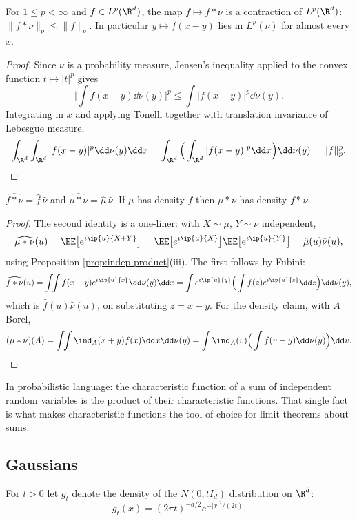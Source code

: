 \begin{proposition}\label{prop:conv-contraction}
	For $1\leq p<\infty$ and $f \in L^p(\R^d)$, the map $f \mapsto f*\nu$ is a contraction of $L^p(\R^d)$: $\|f*\nu\|_p \leq \|f\|_p$. In particular $y \mapsto f(x-y)$ lies in $L^p(\nu)$ for almost every $x$.
\end{proposition}
\begin{proof}
	Since $\nu$ is a probability measure, Jensen's inequality applied to the convex function $t\mapsto |t|^p$ gives
	$$
	\Big| \int f(x-y)\dd\nu(y)\Big|^p \leq \int |f(x-y)|^p\dd\nu(y).
	$$
	Integrating in $x$ and applying Tonelli together with translation invariance of Lebesgue measure,
	$$
	\int_{\R^d}\int_{\R^d}|f(x-y)|^p\dd\nu(y)\dd x = \int_{\R^d}\Big(\int_{\R^d}|f(x-y)|^p\dd x\Big)\dd\nu(y) = \|f\|_p^p. \qedhere
	$$
\end{proof}

\begin{proposition}\label{prop:conv-fourier}
	$\widehat{f*\nu} = \hat f\,\hat\nu$ and $\widehat{\mu*\nu}=\hat\mu\,\hat\nu$. If $\mu$ has density $f$ then $\mu*\nu$ has density $f*\nu$.
\end{proposition}
\begin{proof}
	The second identity is a one-liner: with $X\sim\mu$, $Y\sim\nu$ independent,
	$$
	\widehat{\mu*\nu}(u) = \EE\big[e^{i\ip{u}{X+Y}}\big]=\EE\big[e^{i\ip{u}{X}}\big]\EE\big[e^{i\ip{u}{Y}}\big]=\hat\mu(u)\hat\nu(u),
	$$
	using Proposition \ref{prop:indep-product}(iii). The first follows by Fubini:
	$$
	\widehat{f*\nu}(u) = \int\!\!\int f(x-y)e^{i\ip{u}{x}}\dd\nu(y)\dd x = \int e^{i\ip{u}{y}}\Big(\int f(z)e^{i\ip{u}{z}}\dd z\Big)\dd\nu(y),
	$$
	which is $\hat f(u)\hat\nu(u)$, on substituting $z = x-y$. For the density claim, with $A$ Borel,
	$$
	(\mu*\nu)(A) = \int\!\!\int\ind_A(x+y)f(x)\dd x\dd\nu(y) = \int \ind_A(v)\Big(\int f(v-y)\dd\nu(y)\Big)\dd v. \qedhere
	$$
\end{proof}

In probabilistic language: the characteristic function of a sum of independent random variables is the product of their characteristic functions. That single fact is what makes characteristic functions the tool of choice for limit theorems about sums.

\subsection{Gaussians}

\begin{definition}
	For $t>0$ let $g_t$ denote the density of the $N(0,tI_d)$ distribution on $\R^d$:
	$$
	g_t(x) = (2\pi t)^{-d/2}e^{-|x|^2/(2t)}.
	$$
\end{definition}

